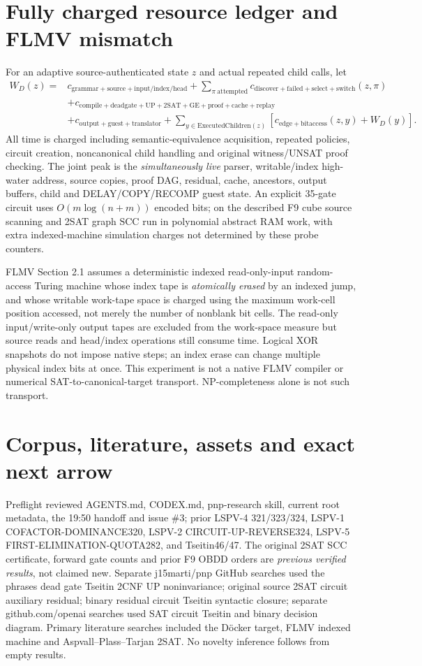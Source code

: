 \documentclass[11pt]{article}
\begin{document}
\section{Fully charged resource ledger and FLMV mismatch}
For an adaptive source-authenticated state $z$ and actual repeated child calls, let
\[
\begin{split}
W_D(z)={}&c_{\mathrm{grammar+source+input/index/head}}
+\sum_{\pi\mathrm{\ attempted}}c_{\mathrm{discover+failed+select+switch}}(z,\pi)\\
&+c_{\mathrm{compile+deadgate+UP+2SAT+GE+proof+cache+replay}}\\
&+c_{\mathrm{output+guest+translator}}
+\sum_{y\in\mathrm{ExecutedChildren}(z)}
[c_{\mathrm{edge+bitaccess}}(z,y)+W_D(y)].
\end{split}
\]
All time is charged including semantic-equivalence acquisition, repeated policies, circuit creation, noncanonical child handling and original witness/UNSAT proof checking. The joint peak is the \emph{simultaneously live} parser, writable/index high-water address, source copies, proof DAG, residual, cache, ancestors, output buffers, child and DELAY/COPY/RECOMP guest state. An explicit 35-gate circuit uses $O(m\log(n+m))$ encoded bits; on the described F9 cube source scanning and 2SAT graph SCC run in polynomial abstract RAM work, with extra indexed-machine simulation charges not determined by these probe counters.

FLMV Section 2.1 \cite{flmv2005} assumes a deterministic indexed read-only-input random-access Turing machine whose index tape is \emph{atomically erased} by an indexed jump, and whose writable work-tape space is charged using the maximum work-cell position accessed, not merely the number of nonblank bit cells. The read-only input/write-only output tapes are excluded from the work-space measure but source reads and head/index operations still consume time. Logical XOR snapshots do not impose native steps; an index erase can change multiple physical index bits at once. This experiment is not a native FLMV compiler or numerical SAT-to-canonical-target transport. NP-completeness alone is not such transport.

\section{Corpus, literature, assets and exact next arrow}
Preflight reviewed AGENTS.md, CODEX.md, pnp-research skill, current root metadata, the 19:50 handoff and issue \#3; prior LSPV-4 321/323/324, LSPV-1 COFACTOR-DOMINANCE320, LSPV-2 CIRCUIT-UP-REVERSE324, LSPV-5 FIRST-ELIMINATION-QUOTA282, and Tseitin46/47. The original 2SAT SCC certificate, forward gate counts and prior F9 OBDD orders are \emph{previous verified results}, not claimed new. Separate j15marti/pnp GitHub searches used the phrases dead gate Tseitin 2CNF UP noninvariance; original source 2SAT circuit auxiliary residual; binary residual circuit Tseitin syntactic closure; separate github.com/openai searches used SAT circuit Tseitin and binary decision diagram. Primary literature searches included the D\"ocker target, FLMV indexed machine and Aspvall--Plass--Tarjan 2SAT. No novelty inference follows from empty results.
\end{document}
